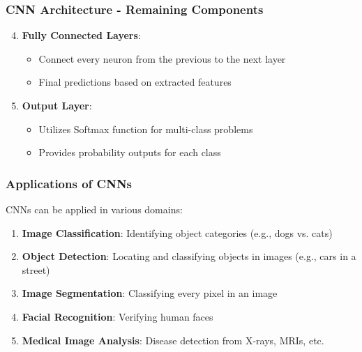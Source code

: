 \documentclass{beamer}
\begin{document}
\begin{frame}[fragile]
    \frametitle{CNN Architecture - Remaining Components}
    \begin{enumerate}
        \setcounter{enumi}{3}
        \item \textbf{Fully Connected Layers}:
            \begin{itemize}
                \item Connect every neuron from the previous to the next layer
                \item Final predictions based on extracted features
            \end{itemize}

        \item \textbf{Output Layer}:
            \begin{itemize}
                \item Utilizes Softmax function for multi-class problems
                \item Provides probability outputs for each class
            \end{itemize}
    \end{enumerate}
\end{frame}

\begin{frame}[fragile]
    \frametitle{Applications of CNNs}
    CNNs can be applied in various domains:
    
    \begin{enumerate}
        \item \textbf{Image Classification}: Identifying object categories (e.g., dogs vs. cats)
        \item \textbf{Object Detection}: Locating and classifying objects in images (e.g., cars in a street)
        \item \textbf{Image Segmentation}: Classifying every pixel in an image
        \item \textbf{Facial Recognition}: Verifying human faces
        \item \textbf{Medical Image Analysis}: Disease detection from X-rays, MRIs, etc.
    \end{enumerate}
\end{frame}
\end{document}

